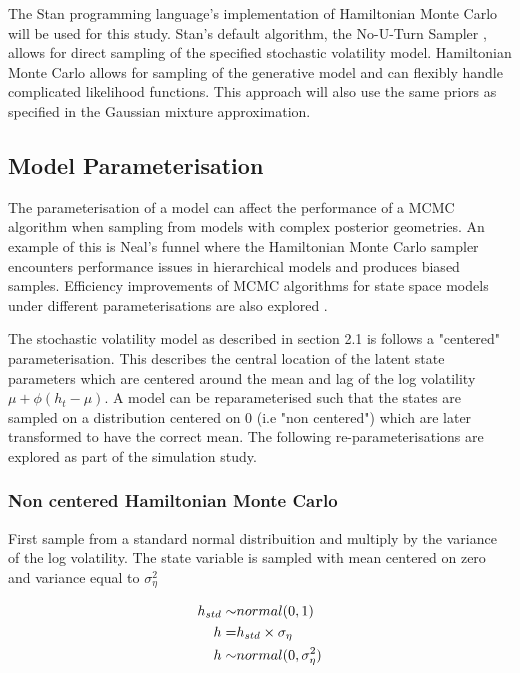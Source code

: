 \documentclass[12pt, a4paper]{article}
\begin{document}
        The Stan programming language's implementation of Hamiltonian Monte Carlo will be used for this study. Stan's default algorithm, the No-U-Turn Sampler \citep{hoffman2014no}, allows for direct sampling of the specified stochastic volatility model. Hamiltonian Monte Carlo allows for sampling of the generative model and can flexibly handle complicated likelihood functions. This approach will also use the same priors as specified in the Gaussian mixture approximation.

    \subsection{Model Parameterisation}

        The parameterisation of a model can affect the performance of a MCMC algorithm when sampling from models with complex posterior geometries. An example of this is Neal's funnel \citep{neal2003slice} where the Hamiltonian Monte Carlo sampler encounters performance issues in hierarchical models and produces biased samples. Efficiency improvements of MCMC algorithms for state space models under different parameterisations are also explored \citet{strickland2008parameterisation}.

        The stochastic volatility model as described in section 2.1 is follows a "centered" parameterisation. This describes the central location of the latent state parameters which are centered around the mean and lag of the log volatility $\mu +\phi(h_t - \mu)$. A model can be reparameterised such that the states are sampled on a distribution centered on 0 (i.e "non centered") which are later transformed to have the correct mean. The following re-parameterisations are explored as part of the simulation study.
        
        \subsubsection{Non centered Hamiltonian Monte Carlo}
        First sample from a standard normal distribuition and multiply by the variance of the log volatility. The state variable is sampled with mean centered on zero and variance equal to $\sigma_{\eta}^2$

        $$
        \begin{aligned}
        h_{std} \sim& \space normal(0,1) \\
        h =& h_{std} \times \sigma_{\eta} \\ 
        h \sim& normal(0, \sigma_{\eta}^2)
        \end{aligned}
        $$
        
\end{document}
